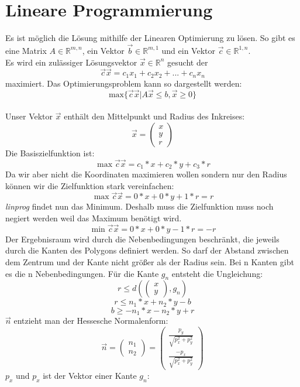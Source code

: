 \documentclass[conference]{IEEEtran}
\begin{document}
	\section{Lineare Programmierung}
	Es ist möglich die Lösung mithilfe der Linearen Optimierung zu lösen. So gibt es eine Matrix $A \in \mathbb{R}^{m,n}$, ein Vektor $\vec{b} \in \mathbb{R}^{m,1}$ und ein Vektor $\vec{c} \in \mathbb{R}^{1,n}$.\\
	Es wird ein zulässiger Lösungsvektor $\vec{x} \in \mathbb{R}^{n}$ gesucht der
	\[ \vec{c}\vec{x} = c_1x_1 + c_2x_2+ ... + c_nx_n \]
	maximiert.
	Das Optimierungsproblem kann so dargestellt werden:
	\[ \text{max}\{\vec{c}\vec{x} | A\vec{x} \leq b, \vec{x} \geq 0\} \]
	\cite{b2}\\
	Unser Vektor $\vec{x}$ enthält den Mittelpunkt und Radius des Inkreises:
	\[ \vec{x} = \left(\begin{array}{c}x\\y\\r\end{array}\right) \]
	Die Basiszielfunktion ist:
	\[\max \vec{c}\vec{x} = c_1*x+c_2*y+c_3*r \]
	Da wir aber nicht die Koordinaten maximieren wollen sondern nur den Radius können wir die Zielfunktion stark vereinfachen:
	\[ \max \vec{c}\vec{x} = 0*x+0*y+1*r = r \]
	\textit{linprog} findet nun das Minimum. Deshalb muss die Zielfunktion muss noch negiert werden weil das Maximum benötigt wird.\\
	\[ \min \vec{c}\vec{x} = 0*x+0*y-1*r = -r \]
	Der Ergebnisraum wird durch die Nebenbedingungen beschränkt, die jeweils durch die Kanten des Polygons definiert werden. So darf der Abstand zwischen dem Zentrum und der Kante nicht größer als der Radius sein. Bei n Kanten gibt es die n Nebenbedingungen. Für die Kante $g_n$ entsteht die Ungleichung:
	\[  r \leq d(\left(\begin{array}{c}x\\y\end{array}\right), g_n) \]
	\[  r \leq n_1 * x + n_2 * y - b \]
	\[  b \geq -n_1 * x - n_2 * y + r \]
	$\vec{n}$ entzieht man der Hessesche Normalenform:
	\[ \vec{n} =  \left(\begin{array}{c}n_1\\n_2\end{array}\right) = \left(\begin{array}{c}\frac{p_y}{\sqrt{p_x^2+p_y^2}}\\\frac{-p_x}{\sqrt{p_x^2+p_y^2}}\end{array}\right) \]
	$p_x$ und $p_x$ ist der Vektor einer Kante $g_n$:\\
\end{document}
